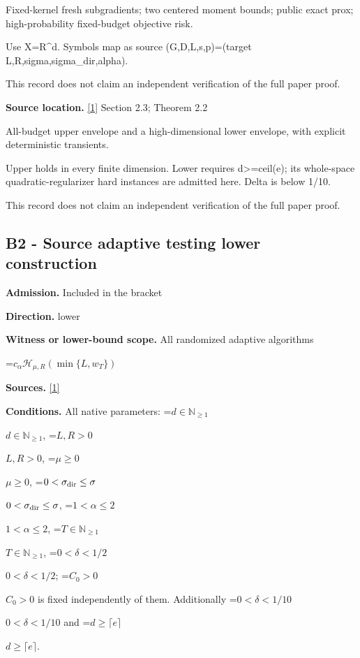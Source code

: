 \documentclass[10pt,a4paper]{article}
\newcommand{\AtlasMath}[1]{\par\begingroup\centering\setbox0=\hbox{$\displaystyle #1$}\ifdim\wd0>1.4\linewidth\typeout{ATLAS WIDE FORMULA: \the\wd0}\fi\ifdim\wd0>\linewidth\resizebox{\linewidth}{!}{\box0}\else\box0\fi\par\endgroup}
\newcommand{\AtlasInlineMath}[1]{\begingroup\setbox0=\hbox{$#1$}\ifdim\wd0>.4\linewidth\endgroup\AtlasMath{#1}\else\endgroup$#1$\fi}
\begin{document}
Fixed-kernel fresh subgradients; two centered moment bounds; public exact prox; high-probability fixed-budget objective risk.



Use X=R\textasciicircum{}d. Symbols map as source (G,D,L,s,p)=(target L,R,sigma,sigma\_dir,alpha).



This record does not claim an independent verification of the full paper proof.



\textbf{Source location.} \href{https://arxiv.org/html/2610.00260v2}{[1]} Section 2.3; Theorem 2.2



All-budget upper envelope and a high-dimensional lower envelope, with explicit deterministic transients.



Upper holds in every finite dimension. Lower requires d>=ceil(e); its whole-space quadratic-regularizer hard instances are admitted here. Delta is below 1/10.



This record does not claim an independent verification of the full paper proof.



\subsection{B2 - Source adaptive testing lower construction}


\textbf{Admission.} Included in the bracket



\textbf{Direction.} lower



\textbf{Witness or lower-bound scope.} All randomized adaptive algorithms



\AtlasMath{c_\alpha\mathcal H_{\mu,R}(\min\{L,w_T\})}


\textbf{Sources.} \href{https://arxiv.org/html/2610.00260v2}{[1]}



\textbf{Conditions.} All native parameters: \AtlasInlineMath{d\in\mathbb N_{\ge1}}, \AtlasInlineMath{L,R>0}, \AtlasInlineMath{\mu\ge0}, \AtlasInlineMath{0<\sigma_{\rm dir}\le\sigma}, \AtlasInlineMath{1<\alpha\le2}, \AtlasInlineMath{T\in\mathbb N_{\ge1}}, \AtlasInlineMath{0<\delta<1/2}; \AtlasInlineMath{C_0>0} is fixed independently of them. Additionally \AtlasInlineMath{0<\delta<1/10} and \AtlasInlineMath{d\ge\lceil e\rceil}.
\end{document}
